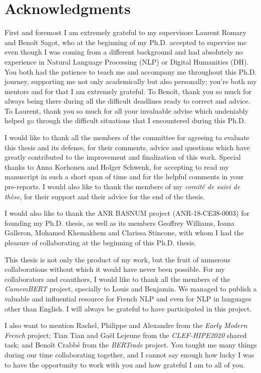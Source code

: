 \section*{Acknowledgments}
First and foremost I am extremely grateful to my supervisors Laurent Romary and Benoît Sagot, who at the beginning of my Ph.D. accepted to supervise me even though I was coming from a different background and had absolutely no experience in Natural Language Processing (NLP) or Digital Humanities (DH). You both had the patience to teach me and accompany me throughout this Ph.D. journey, supporting me not only academically but also personally; you're both my mentors and for that I am extremely grateful. To Benoît, thank you so much for always being there during all the difficult deadlines ready to correct and advice. To Laurent, thank you so much for all your invaluable advise which undeniably helped go through the difficult situations that I encountered during this Ph.D.

I would like to thank all the members of the committee for agreeing to evaluate this thesis and its defense, for their comments, advice and questions which have greatly contributed to the improvement and finalization of this work. Special thanks to Anna Korhonen and Holger Schwenk, for accepting to read my manuscript in such a short span of time and for the helpful comments in your pre-reports. I would also like to thank the members of my \emph{comité de suivi de thèse}, for their support and their advice for the end of the thesis.

I would also like to thank the ANR BASNUM project (ANR-18-CE38-0003) for founding my Ph.D. thesis, as well as its members Geoffrey Williams, Ioana Galleron, Mohamed Khemakhem and Clarissa Stincone, with whom I had the pleasure of collaborating at the beginning of this Ph.D. thesis.

This thesis is not only the product of my work, but the fruit of numerous collaborations without which it would have never been possible. For my collaborators and coauthors, I would like to thank all the members of the \emph{CamemBERT} project, specially to Louis and Benjamin. We managed to publish a valuable and influential resource for French NLP and even for NLP in languages other than English. I will always be grateful to have participated in this project.

I also want to mention Rachel, Philippe and Alexandre from the \emph{Early Modern French} project; Tian Tian and Gaël Lejeune from the \emph{CLEF-HIPE2020} shared task; and Benoît Crabbé from the \emph{BERTrade} project. You taught me many things during our time collaborating together, and I cannot say enough how lucky I was to have the opportunity to work with you and how grateful I am to all of you.

